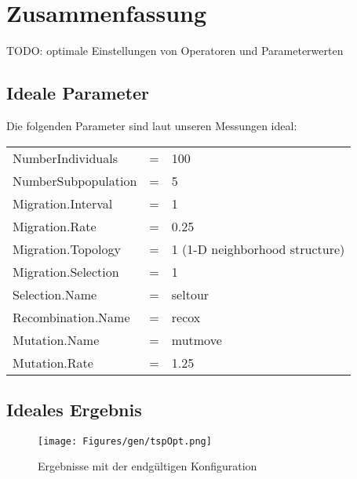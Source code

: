 \section{Zusammenfassung}\label{conclusion}

TODO: optimale Einstellungen von Operatoren und Parameterwerten

\subsection{Ideale Parameter}

Die folgenden Parameter sind laut unseren Messungen ideal: \\

\begin{tabular}{l c l}
  NumberIndividuals   & = & 100       \\
  NumberSubpopulation & = & 5         \\
  Migration.Interval  & = & 1         \\
  Migration.Rate      & = & 0.25      \\
  Migration.Topology  & = & 1 (1-D neighborhood structure) \\
  Migration.Selection & = & 1         \\
  Selection.Name      & = & seltour   \\
  Recombination.Name  & = & recox     \\
  Mutation.Name       & = & mutmove   \\
  Mutation.Rate       & = & 1.25
\end{tabular}

\subsection{Ideales Ergebnis}



\begin{figure}[h!]
  \centering
  \texttt{[image: Figures/gen/tspOpt.png]}
  \caption{Ergebnisse mit der endgültigen Konfiguration}\label{fig.tspOpt}
\end{figure}

